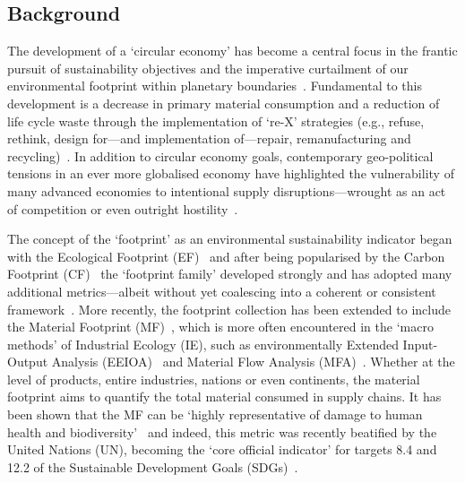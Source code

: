\subsection{Background}\label{sec:intro-background}

The development of a `circular economy' has become a central focus in the frantic pursuit of sustainability objectives and the imperative curtailment of our environmental footprint within planetary boundaries~\citep{eu2019greendeal, eu2020circ,nl2023ceplan,nl2016ceplan,pardo2018ce,ellenmacarthur2015ce}. Fundamental to this development is a decrease in primary material consumption and a reduction of life cycle waste through the implementation of `re-X' strategies (e.g., refuse, rethink, design for---and implementation of---repair, remanufacturing and recycling)~\citep{reike2018rex, eu2022ecodesign, eu2022repair, eu2015reman}. In addition to circular economy goals, contemporary geo-political tensions in an ever more globalised economy have highlighted the vulnerability of many advanced economies to intentional supply disruptions---wrought as an act of competition or even outright hostility~\citep{jrc2023supplychain,hartley2024cepolitics,berry2023crm}.

The concept of the `footprint' as an environmental sustainability indicator began with the Ecological Footprint (EF)~\citep{wackernagel1994ecologicalfootprint} and after being popularised by the Carbon Footprint (CF)~\citep{cucek2015environmentalfootprints} the `footprint family' developed strongly and has adopted many additional metrics---albeit without yet coalescing into a coherent or consistent framework~\citep{giampietro2014footprintstonowhere, vanham2019footprints,ridoutt2013footprints}. More recently, the footprint collection has been extended to include the Material Footprint (MF)~\citep{weidmann2013materialfootprint}, which is more often encountered in the `macro methods' of Industrial Ecology (IE), such as environmentally Extended Input-Output Analysis (EEIOA)~\citep{lenzen2022materialfootprint} and Material Flow Analysis (MFA)~\citep{schaffartzik2013mfafootprint}. Whether at the level of products, entire industries, nations or even continents, the material footprint aims to quantify the total material consumed in supply chains. It has been shown that the MF can be `highly representative of damage to human health and biodiversity'~\citep{steinmann2017resourcefootprints} and indeed, this metric was recently beatified by the United Nations (UN), becoming the `core official indicator' for targets 8.4 and 12.2 of the Sustainable Development Goals (SDGs)~\citep{lenzen2022materialfootprint}.

